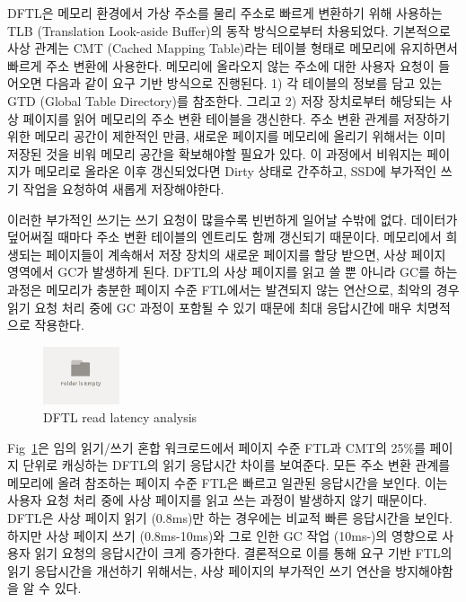 \documentclass[conference]{IEEEtran}
\begin{document}
DFTL은 메모리 환경에서 가상 주소를 물리 주소로 빠르게 변환하기 위해 사용하는
TLB (Translation Look-aside Buffer)의 동작 방식으로부터 차용되었다. 기본적으로 사상 관계는
CMT (Cached Mapping Table)라는 테이블 형태로 메모리에 유지하면서 빠르게 주소 변환에 사용한다.
메모리에 올라오지 않는 주소에 대한 사용자 요청이 들어오면 다음과 같이 요구 기반 방식으로 진행된다.
1) 각 테이블의 정보를 담고 있는 GTD (Global Table Directory)를 참조한다. 그리고 2) 저장 장치로부터
해당되는 사상 페이지를 읽어 메모리의 주소 변환 테이블을 갱신한다. 주소 변환 관계를 저장하기 위한
메모리 공간이 제한적인 만큼, 새로운 페이지를 메모리에 올리기 위해서는 이미 저장된 것을 비워
메모리 공간을 확보해야할 필요가 있다. 이 과정에서 비워지는 페이지가 메모리로 올라온 이후 갱신되었다면
Dirty 상태로 간주하고, SSD에 부가적인 쓰기 작업을 요청하여 새롭게 저장해야한다. \par

이러한 부가적인 쓰기는 쓰기 요청이 많을수록 빈번하게 일어날 수밖에 없다. 데이터가 덮어써질 때마다
주소 변환 테이블의 엔트리도 함께 갱신되기 때문이다. 메모리에서 희생되는 페이지들이 계속해서
저장 장치의 새로운 페이지를 할당 받으면, 사상 페이지 영역에서 GC가 발생하게 된다.
DFTL의 사상 페이지를 읽고 쓸 뿐 아니라 GC를 하는 과정은 메모리가 충분한 페이지 수준 FTL에서는
발견되지 않는 연산으로, 최악의 경우 읽기 요청 처리 중에 GC 과정이 포함될 수 있기 때문에
최대 응답시간에 매우 치명적으로 작용한다. \par

\begin{figure}[h]
	\centering
	\includegraphics[width=0.2\textwidth]{image/bg.png}
	\caption{DFTL read latency analysis}
	\label{fig:DFTL_cdf}
\end{figure}

Fig~\ref{fig:DFTL_cdf}은 임의 읽기/쓰기 혼합 워크로드에서 페이지 수준 FTL과 CMT의 25\%를
페이지 단위로 캐싱하는 DFTL의 읽기 응답시간 차이를 보여준다. 모든 주소 변환 관계를 메모리에 올려
참조하는 페이지 수준 FTL은 빠르고 일관된 응답시간을 보인다. 이는 사용자 요청 처리 중에
사상 페이지를 읽고 쓰는 과정이 발생하지 않기 때문이다. DFTL은 사상 페이지 읽기 (0.8ms)만
하는 경우에는 비교적 빠른 응답시간을 보인다. 하지만 사상 페이지 쓰기 (0.8ms-10ms)와 그로 인한
GC 작업 (10ms-)의 영향으로 사용자 읽기 요청의 응답시간이 크게 증가한다. 결론적으로 이를 통해
요구 기반 FTL의 읽기 응답시간을 개선하기 위해서는, 사상 페이지의 부가적인 쓰기 연산을
방지해야함을 알 수 있다. \par
\end{document}
